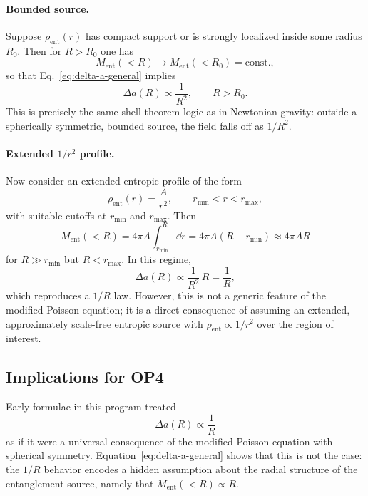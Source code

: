 \documentclass[11pt]{article}
\begin{document}
\paragraph{Bounded source.} Suppose $\rho_{\text{ent}}(r)$ has compact support or is strongly localized inside some radius $R_0$. Then for $R>R_0$ one has
\begin{equation}
 M_{\text{ent}}(<R) \to M_{\text{ent}}(<R_0) = \text{const.},
\end{equation}
so that Eq.~\eqref{eq:delta-a-general} implies
\begin{equation}
 \Delta a(R) \propto \frac{1}{R^2}, \qquad R>R_0.
\end{equation}
This is precisely the same shell-theorem logic as in Newtonian gravity: outside a spherically symmetric, bounded source, the field falls off as $1/R^2$.

\paragraph{Extended $1/r^2$ profile.} Now consider an extended entropic profile of the form
\begin{equation}
 \rho_{\text{ent}}(r) = \frac{A}{r^2}, \qquad r_\text{min} < r < r_\text{max},
\end{equation}
with suitable cutoffs at $r_\text{min}$ and $r_\text{max}$. Then
\begin{equation}
 M_{\text{ent}}(<R) = 4\pi A \int_{r_\text{min}}^R \dd r = 4\pi A (R - r_\text{min}) \approx 4\pi A R
\end{equation}
for $R\gg r_\text{min}$ but $R<r_\text{max}$. In this regime,
\begin{equation}
 \Delta a(R) \propto \frac{1}{R^2}\,R = \frac{1}{R},
\end{equation}
which reproduces a $1/R$ law. However, this is not a generic feature of the modified Poisson equation; it is a direct consequence of assuming an extended, approximately scale-free entropic source with $\rho_{\text{ent}}\propto 1/r^2$ over the region of interest.

\subsection{Implications for OP4}

Early formulae in this program treated
\begin{equation}
 \Delta a(R) \propto \frac{1}{R}
\end{equation}
as if it were a universal consequence of the modified Poisson equation with spherical symmetry. Equation~\eqref{eq:delta-a-general} shows that this is not the case: the $1/R$ behavior encodes a hidden assumption about the radial structure of the entanglement source, namely that $M_{\text{ent}}(<R)\propto R$.
\end{document}
